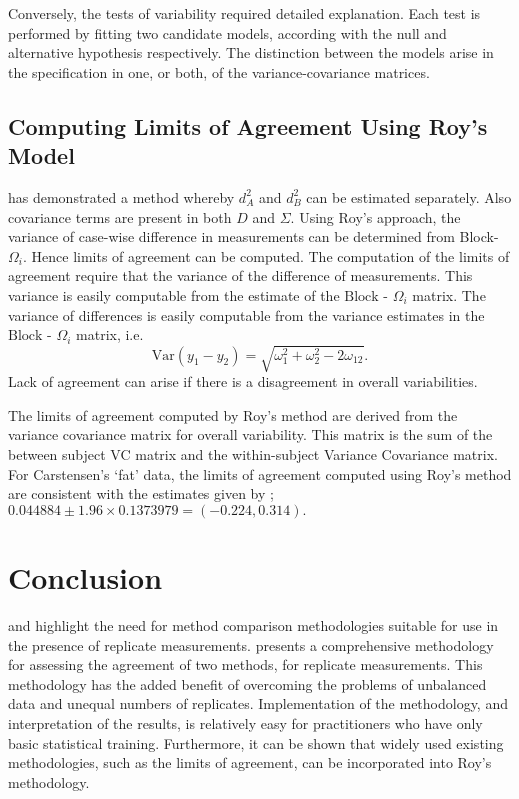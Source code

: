 \documentclass[12pt, a4paper]{report}
\theoremstyle{plain}
\theoremstyle{definition}
\theoremstyle{remark}
\begin{document}
Conversely, the tests of variability required detailed explanation. Each test is performed by fitting two candidate models, according with the null and alternative hypothesis respectively. The distinction between the models arise in the specification in one, or both, of the variance-covariance matrices. %














\subsection{Computing Limits of Agreement Using Roy's Model}
\citet{ARoy2009} has demonstrated a method whereby $d^2_{A}$ and $d^2_{B}$ can be estimated separately. Also covariance terms are present in both ${D}$ and ${\Sigma}$. Using Roy's approach, the variance of case-wise difference in measurements can be determined from Block-${\Omega}_{i}$. Hence limits of agreement can be computed. The computation of the limits of agreement require that the variance of the difference of measurements. This variance is easily computable from the estimate of the ${\mbox{Block - } \Omega_{i}}$ matrix.
The variance of differences is easily computable from the variance estimates in the ${\mbox{Block - } \Omega_{i}}$ matrix, i.e.
\[
\mathrm{Var}(y_1 - y_2) = \sqrt{ \omega^2_1 + \omega^2_2 - 2\omega_{12}}.
\]
Lack of agreement can arise if there is a disagreement in overall variabilities. 

The limits of agreement computed by Roy's method are derived from the variance covariance matrix for overall variability.
This matrix is the sum of the between subject VC matrix and the within-subject Variance Covariance matrix.
For Carstensen's `fat' data, the limits of agreement computed using Roy's
method are consistent with the estimates given by \citet{BXC2008}; $0.044884  \pm 1.96 \times  0.1373979 = (-0.224,  0.314).$




\section{Conclusion}
\citet{BXC2008} and \citet{ARoy2009} highlight the need for method comparison methodologies suitable for use in the presence of replicate measurements. \citet{ARoy2009} presents a comprehensive methodology for assessing the agreement of two methods, for replicate measurements. This methodology has the added benefit of overcoming the problems of unbalanced data and unequal numbers of replicates. Implementation of the methodology, and interpretation of the results, is relatively easy for practitioners who have only basic statistical training. Furthermore, it can be shown that widely used existing methodologies, such as the limits of agreement, can be incorporated into Roy's methodology.
\end{document}
